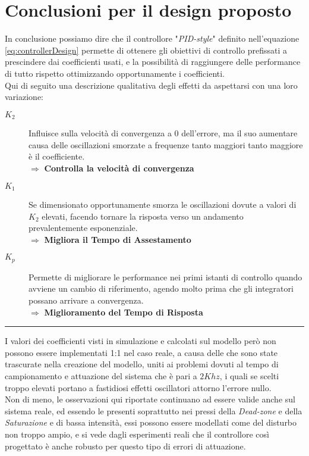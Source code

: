 \section{Conclusioni per il design proposto} \label{sec:designControlloreConclusioni}
In conclusione possiamo dire che il controllore "\textit{PID-style}" definito nell'equazione \ref{eq:controllerDesign} permette di ottenere gli obiettivi di controllo prefissati a prescindere dai coefficienti usati, e la possibilità di raggiungere delle performance di tutto rispetto ottimizzando opportunamente i coefficienti.\\
Qui di seguito una descrizione qualitativa degli effetti da aspettarsi con una loro variazione:
\begin{description}
	\item[{\boldmath$ K_2 $}] Influisce sulla velocità di convergenza a 0 dell'errore, ma il suo aumentare causa delle oscillazioni smorzate a frequenze tanto maggiori tanto maggiore è il coefficiente. \\
	$\Rightarrow$ \textbf{Controlla la velocità di convergenza}
	\item[{\boldmath$ K_1 $}] Se dimensionato opportunamente smorza le oscillazioni dovute a valori di $ K_2 $ elevati, facendo tornare la risposta verso un andamento prevalentemente esponenziale.\\
	$\Rightarrow$ \textbf{Migliora il Tempo di Assestamento}
	\item[{\boldmath$ K_p $}] Permette di migliorare le performance nei primi istanti di controllo quando avviene un cambio di riferimento, agendo molto prima che gli integratori possano arrivare a convergenza.\\
	$\Rightarrow$ \textbf{Miglioramento del Tempo di Risposta}
\end{description} \vspace{-8mm}
\noindent
\begin{center}
	\rule{0.75\linewidth}{0.5px}
\end{center}\vspace{-4mm}
\noindent
I valori dei coefficienti visti in simulazione e calcolati sul modello però non possono essere implementati 1:1 nel caso reale, a causa delle \nonLinearita che sono state trascurate nella creazione del modello, uniti ai problemi dovuti al tempo di campionamento e attuazione del sistema che è pari a $ 2Khz $, i quali se scelti troppo elevati portano a fastidiosi effetti oscillatori attorno l'errore nullo.\\
Non di meno, le osservazioni qui riportate continuano ad essere valide anche sul sistema reale, ed essendo le \nonLinearita presenti soprattutto nei pressi della \textit{Dead-zone} e della \textit{Saturazione} e di bassa intensità, essi possono essere modellati come del disturbo non troppo ampio, e si vede dagli esperimenti reali che il controllore così progettato è anche robusto per questo tipo di errori di attuazione.



